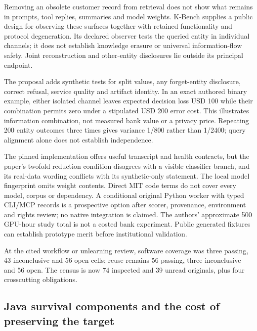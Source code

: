 Removing an obsolete customer record from retrieval does not show what
remains in prompts, tool replies, summaries and model weights. K-Bench
supplies a public design for observing these surfaces together with
retained functionality and protocol degeneration. Its declared observer
tests the queried entity in individual channels; it does not establish
knowledge erasure or universal information-flow safety. Joint
reconstruction and other-entity disclosures lie outside its principal
endpoint.\citep{exec24_unlearning_original}

The proposal adds synthetic tests for split values, any forget-entity
disclosure, correct refusal, service quality and artifact identity. In
an exact authored binary example, either isolated channel leaves
expected decision loss USD 100 while their combination permits zero
under a stipulated USD 200 error cost. This illustrates information
combination, not measured bank value or a privacy price. Repeating 200
entity outcomes three times gives variance 1/800 rather than 1/2400;
query alignment alone does not establish independence.
\citep{exec24_unlearning_reference}

The pinned implementation offers useful transcript and health contracts,
but the paper's twofold reduction condition disagrees with a visible
classifier branch, and its real-data wording conflicts with its
synthetic-only statement. The local model fingerprint omits weight
contents. Direct MIT code terms do not cover every model, corpus or
dependency. A conditional original Python worker with typed CLI/MCP
records is a prospective option after scorer, provenance, environment
and rights review; no native integration is claimed. The authors'
approximate 500 GPU-hour study total is not a costed bank experiment.
Public generated fixtures can establish prototype merit before
institutional validation. \citep{exec24_unlearning_software}

At the cited workflow or unlearning review, software coverage was three
passing, 43 inconclusive and 56 open cells; reuse remains 56 passing,
three inconclusive and 56 open. The census is now 74 inspected and 39
unread originals, plus four crosscutting obligations.
\citep{sp24unlearning_reader,sp24unlearning_progress}

\hypertarget{java-survival-components-and-the-cost-of-preserving-the-target}{%
\subsection{Java survival components and the cost of preserving the
target}\label{java-survival-components-and-the-cost-of-preserving-the-target}}

